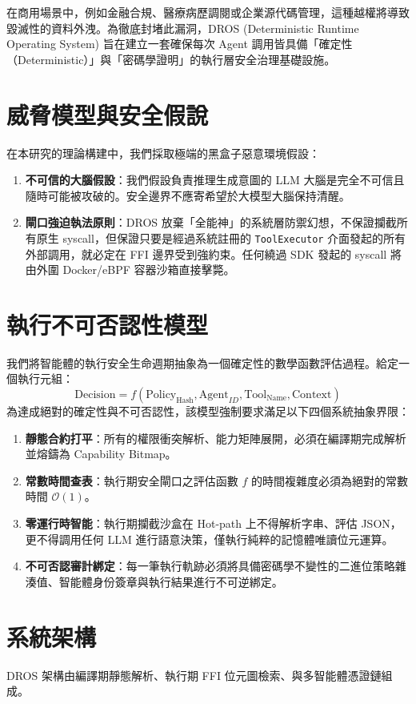 \documentclass[UTF8]{ctexart}
\begin{document}
在商用場景中，例如金融合規、醫療病歷調閱或企業源代碼管理，這種越權將導致毀滅性的資料外洩。為徹底封堵此漏洞，DROS (Deterministic Runtime Operating System) 旨在建立一套確保每次 Agent 調用皆具備「確定性（Deterministic）」與「密碼學證明」的執行層安全治理基礎設施。

\section{威脅模型與安全假說}
在本研究的理論構建中，我們採取極端的黑盒子惡意環境假設：
\begin{enumerate}
\item \textbf{不可信的大腦假設}：我們假設負責推理生成意圖的 LLM 大腦是完全不可信且隨時可能被攻破的。安全邊界不應寄希望於大模型大腦保持清醒。
\item \textbf{閘口強迫執法原則}：DROS 放棄「全能神」的系統層防禦幻想，不保證攔截所有原生 syscall，但保證只要是經過系統註冊的 \texttt{ToolExecutor} 介面發起的所有外部調用，就必定在 FFI 邊界受到強約束。任何繞過 SDK 發起的 syscall 將由外圍 Docker/eBPF 容器沙箱直接擊斃。
\end{enumerate}

\section{執行不可否認性模型}
我們將智能體的執行安全生命週期抽象為一個確定性的數學函數評估過程。給定一個執行元組：
\begin{equation}
\text{Decision} = f(\text{Policy}_{\text{Hash}}, \text{Agent}_{ID}, \text{Tool}_{\text{Name}}, \text{Context})
\end{equation}
為達成絕對的確定性與不可否認性，該模型強制要求滿足以下四個系統抽象界限：
\begin{enumerate}
\item \textbf{靜態合約打平}：所有的權限衝突解析、能力矩陣展開，必須在編譯期完成解析並熔鑄為 Capability Bitmap。
\item \textbf{常數時間查表}：執行期安全閘口之評估函數 $f$ 的時間複雜度必須為絕對的常數時間 $\mathcal{O}(1)$。
\item \textbf{零運行時智能}：執行期攔截沙盒在 Hot-path 上不得解析字串、評估 JSON，更不得調用任何 LLM 進行語意決策，僅執行純粹的記憶體唯讀位元運算。
\item \textbf{不可否認審計綁定}：每一筆執行軌跡必須將具備密碼學不變性的二進位策略雜湊值、智能體身份簽章與執行結果進行不可逆綁定。
\end{enumerate}

\section{系統架構}
DROS 架構由編譯期靜態解析、執行期 FFI 位元圖檢索、與多智能體憑證鏈組成。
\end{document}
